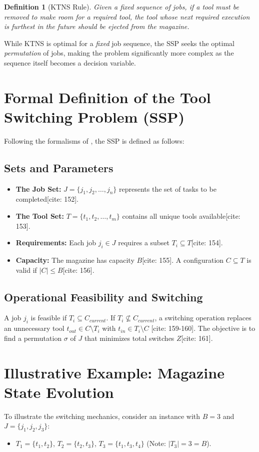 \documentclass[12pt]{article}
\newtheorem{definition}{Definition}[section]
\begin{document}
\begin{definition}[KTNS Rule]
Given a fixed sequence of jobs, if a tool must be removed to make room for a required tool, the tool whose next required execution is furthest in the future should be ejected from the magazine.
\end{definition}

While KTNS is optimal for a \textit{fixed} job sequence, the SSP seeks the optimal \textit{permutation} of jobs, making the problem significantly more complex as the sequence itself becomes a decision variable.

\section{Formal Definition of the Tool Switching Problem (SSP)}

Following the formalisms of \textcite{Colares2026}, the SSP is defined as follows:

\subsection{Sets and Parameters}
\begin{itemize}
    \item \textbf{The Job Set:} $J = \{j_1, j_2, \dots, j_n\}$ represents the set of tasks to be completed[cite: 152].
    \item \textbf{The Tool Set:} $T = \{t_1, t_2, \dots, t_m\}$ contains all unique tools available[cite: 153].
    \item \textbf{Requirements:} Each job $j_i \in J$ requires a subset $T_i \subseteq T$[cite: 154].
    \item \textbf{Capacity:} The magazine has capacity $B$[cite: 155]. A configuration $C \subseteq T$ is valid if $|C| \le B$[cite: 156].
\end{itemize}

\subsection{Operational Feasibility and Switching}
A job $j_i$ is feasible if $T_i \subseteq C_{current}$. If $T_i \not\subseteq C_{current}$, a switching operation replaces an unnecessary tool $t_{out} \in C \setminus T_i$ with $t_{in} \in T_i \setminus C$ [cite: 159-160]. The objective is to find a permutation $\sigma$ of $J$ that minimizes total switches $Z$[cite: 161].

\section{Illustrative Example: Magazine State Evolution}
To illustrate the switching mechanics, consider an instance with $B=3$ and $J=\{j_1, j_2, j_3\}$:
\begin{itemize}
    \item $T_1 = \{t_1, t_2\}$, $T_2 = \{t_2, t_3\}$, $T_3 = \{t_1, t_3, t_4\}$ (Note: $|T_3|=3=B$).
\end{itemize}
\end{document}
